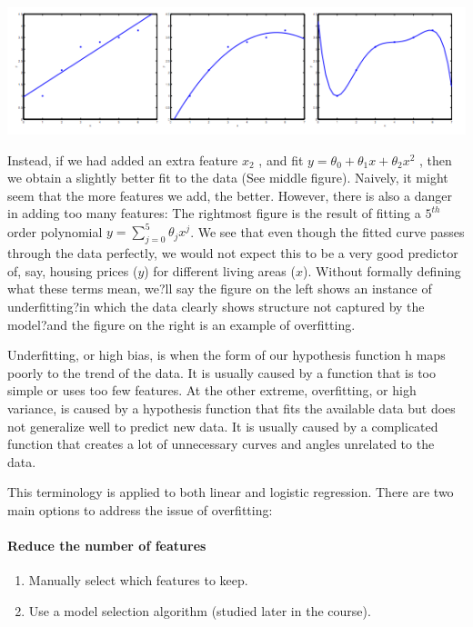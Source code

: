\documentclass[UTF8]{article}
\begin{document}
\includegraphics[width = \textwidth]{NotePics/7_1_1.png}

Instead, if we had added an extra feature $x_2$ , and fit $y = \theta_0+\theta_1x+\theta_2x^2$ , then we obtain a slightly better fit to the data (See middle figure). Naively, it might seem that the more features we add, the better. However, there is also a danger in adding too many features: The rightmost figure is the result of fitting a $5^{th}$ order polynomial $y = \sum_{j=0} ^5 \theta_j x^j$. We see that even though the fitted curve passes through the data perfectly, we would not expect this to be a very good predictor of, say, housing prices ($y$) for different living areas ($x$). Without formally defining what these terms mean, we?ll say the figure on the left shows an instance of underfitting?in which the data clearly shows structure not captured by the model?and the figure on the right is an example of overfitting.

Underfitting, or high bias, is when the form of our hypothesis function h maps poorly to the trend of the data. It is usually caused by a function that is too simple or uses too few features. At the other extreme, overfitting, or high variance, is caused by a hypothesis function that fits the available data but does not generalize well to predict new data. It is usually caused by a complicated function that creates a lot of unnecessary curves and angles unrelated to the data.

This terminology is applied to both linear and logistic regression. There are two main options to address the issue of overfitting:

\paragraph{Reduce the number of features}
\begin{enumerate}[(1)] 
\item Manually select which features to keep. 
\item Use a model selection algorithm (studied later in the course). 
\end{enumerate}
\end{document}
